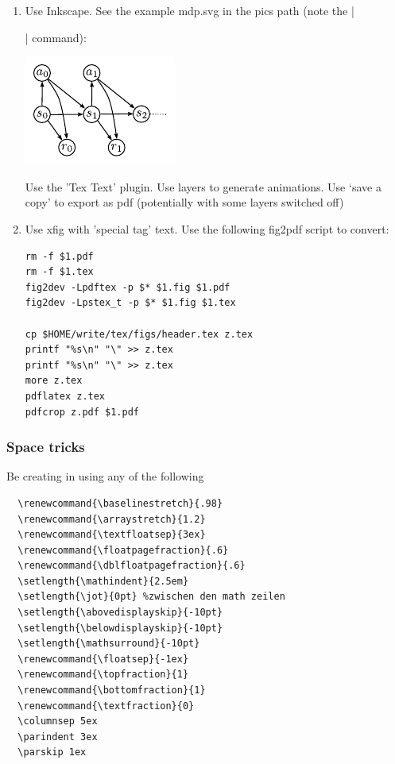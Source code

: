 \begin{enumerate}

\item Use Inkscape. See the example mdp.svg in the pics path (note
the |\graphicspath{{pics/}}| command):

\centerline{\includegraphics[scale=.5]{mdp}}


  Use the 'Tex Text' plugin. Use layers to generate animations. Use
  `save a copy' to export as pdf (potentially with some layers
  switched off)

\item Use xfig with 'special tag' text. Use the following fig2pdf script to
  convert:

\begin{code}
\begin{verbatim}
rm -f $1.pdf
rm -f $1.tex
fig2dev -Lpdftex -p $* $1.fig $1.pdf
fig2dev -Lpstex_t -p $* $1.fig $1.tex

cp $HOME/write/tex/figs/header.tex z.tex
printf "%s\n" "\" >> z.tex
printf "%s\n" "\" >> z.tex
more z.tex
pdflatex z.tex
pdfcrop z.pdf $1.pdf
\end{verbatim}
\end{code}
\end{enumerate}



\subsubsection{Space tricks}

Be creating in using any of the following\\
\begin{code}
\begin{verbatim}
  \renewcommand{\baselinestretch}{.98}
  \renewcommand{\arraystretch}{1.2}
  \renewcommand{\textfloatsep}{3ex}
  \renewcommand{\floatpagefraction}{.6}
  \renewcommand{\dblfloatpagefraction}{.6}
  \setlength{\mathindent}{2.5em}
  \setlength{\jot}{0pt} %zwischen den math zeilen
  \setlength{\abovedisplayskip}{-10pt}
  \setlength{\belowdisplayskip}{-10pt}
  \setlength{\mathsurround}{-10pt}
  \renewcommand{\floatsep}{-1ex}
  \renewcommand{\topfraction}{1}
  \renewcommand{\bottomfraction}{1}
  \renewcommand{\textfraction}{0}
  \columnsep 5ex
  \parindent 3ex
  \parskip 1ex
\end{verbatim}
\end{code}

